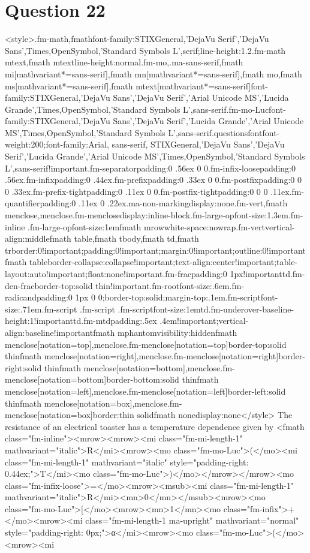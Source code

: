 \documentclass{article}
\begin{document}
\section*{Question 22}
<style>.fm-math,fmath{font-family:STIXGeneral,'DejaVu Serif','DejaVu Sans',Times,OpenSymbol,'Standard Symbols L',serif;line-height:1.2}.fm-math mtext,fmath mtext{line-height:normal}.fm-mo,.ma-sans-serif,fmath mi[mathvariant*=sans-serif],fmath mn[mathvariant*=sans-serif],fmath mo,fmath ms[mathvariant*=sans-serif],fmath mtext[mathvariant*=sans-serif]{font-family:STIXGeneral,'DejaVu Sans','DejaVu Serif','Arial Unicode MS','Lucida Grande',Times,OpenSymbol,'Standard Symbols L',sans-serif}.fm-mo-Luc{font-family:STIXGeneral,'DejaVu Sans','DejaVu Serif','Lucida Grande','Arial Unicode MS',Times,OpenSymbol,'Standard Symbols L',sans-serif}.questionsfont{font-weight:200;font-family:Arial, sans-serif, STIXGeneral,'DejaVu Sans','DejaVu Serif','Lucida Grande','Arial Unicode MS',Times,OpenSymbol,'Standard Symbols L',sans-serif!important}.fm-separator{padding:0 .56ex 0 0}.fm-infix-loose{padding:0 .56ex}.fm-infix{padding:0 .44ex}.fm-prefix{padding:0 .33ex 0 0}.fm-postfix{padding:0 0 0 .33ex}.fm-prefix-tight{padding:0 .11ex 0 0}.fm-postfix-tight{padding:0 0 0 .11ex}.fm-quantifier{padding:0 .11ex 0 .22ex}.ma-non-marking{display:none}.fm-vert,fmath menclose,menclose.fm-menclose{display:inline-block}.fm-large-op{font-size:1.3em}.fm-inline .fm-large-op{font-size:1em}fmath mrow{white-space:nowrap}.fm-vert{vertical-align:middle}fmath table,fmath tbody,fmath td,fmath tr{border:0!important;padding:0!important;margin:0!important;outline:0!important}fmath table{border-collapse:collapse!important;text-align:center!important;table-layout:auto!important;float:none!important}.fm-frac{padding:0 1px!important}td.fm-den-frac{border-top:solid thin!important}.fm-root{font-size:.6em}.fm-radicand{padding:0 1px 0 0;border-top:solid;margin-top:.1em}.fm-script{font-size:.71em}.fm-script .fm-script .fm-script{font-size:1em}td.fm-underover-base{line-height:1!important}td.fm-mtd{padding:.5ex .4em!important;vertical-align:baseline!important}fmath mphantom{visibility:hidden}fmath menclose[notation=top],menclose.fm-menclose[notation=top]{border-top:solid thin}fmath menclose[notation=right],menclose.fm-menclose[notation=right]{border-right:solid thin}fmath menclose[notation=bottom],menclose.fm-menclose[notation=bottom]{border-bottom:solid thin}fmath menclose[notation=left],menclose.fm-menclose[notation=left]{border-left:solid thin}fmath menclose[notation=box],menclose.fm-menclose[notation=box]{border:thin solid}fmath none{display:none}</style> The resistance of an electrical toaster has a temperature dependence given by <fmath class="fm-inline"><mrow><mrow><mi class="fm-mi-length-1" mathvariant="italic">R</mi><mrow><mo class="fm-mo-Luc">(</mo><mi class="fm-mi-length-1" mathvariant="italic" style="padding-right: 0.44ex;">T</mi><mo class="fm-mo-Luc">)</mo></mrow></mrow><mo class="fm-infix-loose">=</mo><mrow><msub><mi class="fm-mi-length-1" mathvariant="italic">R</mi><mn>0</mn></msub><mrow><mo class="fm-mo-Luc">[</mo><mrow><mn>1</mn><mo class="fm-infix">+</mo><mrow><mi class="fm-mi-length-1 ma-upright" mathvariant="normal" style="padding-right: 0px;">α</mi><mrow><mo class="fm-mo-Luc">(</mo><mrow><mi 
\end{document}
